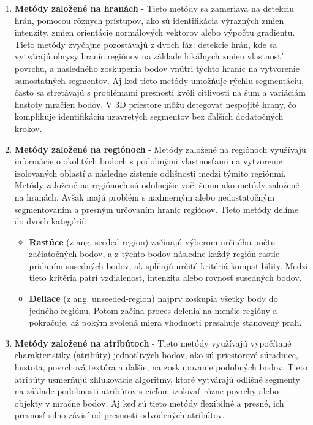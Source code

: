 \begin{enumerate} 
 \item\textbf{Metódy založené na hranách} - Tieto metódy sa zameriava na detekciu hrán, pomocou rôznych prístupov, ako sú identifikácia výrazných zmien intenzity, zmien orientácie normálových vektorov alebo výpočtu gradientu. Tieto metódy zvyčajne pozostávajú z dvoch fáz: detekcie hrán, kde sa vytvárajú obrysy hraníc regiónov na základe lokálnych zmien vlastností povrchu, a následného zoskupenia bodov vnútri týchto hraníc na vytvorenie samostatných segmentov. Aj keď tieto metódy umožňuje rýchlu segmentáciu, často sa stretávajú s problémami presnosti kvôli citlivosti na šum a variáciám hustoty mračien bodov. V 3D priestore môžu detegovať nespojité hrany, čo komplikuje identifikáciu uzavretých segmentov bez ďalších dodatočných krokov. \cite{segmetation_survey} 
 \item\textbf{Metódy založené na regiónoch} - Metódy založené na regiónoch využívajú informácie o okolitých bodoch s podobnými vlastnosťami na vytvorenie izolovaných oblastí a následne zistenie odlišnosti medzi týmito regiónmi. Metódy založené na regiónoch sú odolnejšie voči šumu ako metódy založené na hranách. Avšak majú problém s nadmerným alebo nedostatočným segmentovaním a presným určovaním hraníc regiónov. Tieto metódy delíme do dvoch kategórií:  \cite{segmetation_survey} 
 \begin{itemize}
    \item\textbf{Rastúce} (z ang. seeded-region) začínajú výberom určitého počtu začiatočných bodov, a z týchto bodov následne každý región rastie pridaním susedných bodov, ak spĺňajú určité kritériá kompatibility. Medzi tieto kritéria patrí vzdialenosť, intenzita alebo rovnosť susedných bodov. \cite{segmetation_survey}  
    \item\textbf{Deliace} (z ang. unseeded-region) najprv zoskupia všetky body do jedného regiónu. Potom začína proces delenia na menšie regióny a pokračuje, až pokým zvolená miera vhodnosti presahuje stanovený prah. \cite{segmetation_survey}
 \end{itemize}
 \item\textbf{Metódy založené na atribútoch} - Tieto metódy využívajú vypočítané charakteristiky (atribúty) jednotlivých bodov, ako sú priestorové súradnice, hustota, povrchová textúra a ďalšie, na zoskupovanie podobných bodov. Tieto atribúty usmerňujú zhlukovacie algoritmy, ktoré vytvárajú odlišné segmenty na základe podobnosti atribútov s cieľom izolovať rôzne povrchy alebo objekty v mračne bodov. Aj keď sú tieto metódy flexibilné a presné, ich presnosť silno závisí od presnosti odvodených atribútov.

\end{enumerate}
